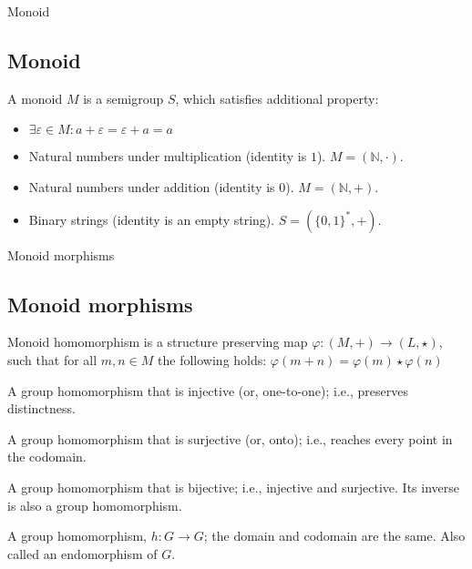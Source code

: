 \documentclass{beamer}
\begin{document}
\begin{frame}{Monoid}
	\subsection{Monoid}
	\begin{definition}
		A monoid $M$ is a semigroup $S$, which satisfies additional property:
		\begin{itemize}
			\item $\exists \varepsilon \in M : a + \varepsilon = \varepsilon + a = a$
		\end{itemize}
	\end{definition}

	\begin{example}
		\begin{itemize}
			\item Natural numbers under multiplication (identity is $1$). $M = (\mathbb{N}, \cdot)$.
			\item Natural numbers under addition (identity is $0$). $M = (\mathbb{N}, +)$.
			\item Binary strings (identity is an empty string). $S = (\{0, 1\}^*, +)$.
		\end{itemize}
	\end{example}
\end{frame}

\begin{frame}{Monoid morphisms}
	\subsection{Monoid morphisms}
	\begin{definition}
		Monoid homomorphism is a structure preserving map $\varphi : (M, +) \to (L, \star)$, such that for all 
		$m, n \in M$ the following holds: $\varphi(m + n) = \varphi(m) \star \varphi(n)$
	\end{definition}
\end{frame}

\begin{frame}
	\begin{definition}[Monomorphism]
		A group homomorphism that is injective (or, one-to-one); i.e., preserves distinctness.
	\end{definition}
	\begin{definition}[Epimorphism]
		A group homomorphism that is surjective (or, onto); i.e., reaches every point in the codomain.		
	\end{definition}
	\begin{definition}[Isomorphism]
		A group homomorphism that is bijective; i.e., injective and surjective. Its inverse is also a group 
		homomorphism.	
	\end{definition}
	\begin{definition}[Endomorphism]
		A group homomorphism, $h: G \to G$; the domain and codomain are the same. Also called an endomorphism of $G$.		
	\end{definition}
\end{frame}
\end{document}
